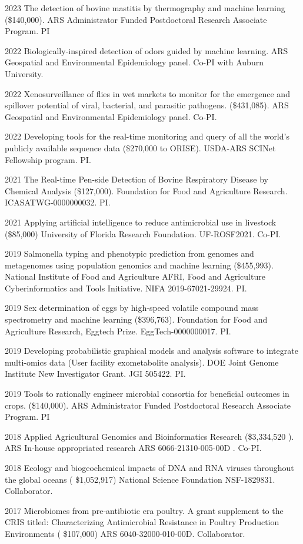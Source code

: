 \documentclass[12pt,letterpaper]{report}
\begin{document}
    \begin{tablist}
    	\item[2023]\tab The detection of bovine mastitis by thermography and machine learning (\$140,000). ARS Administrator Funded Postdoctoral Research Associate Program. PI
    	\item[2022]\tab Biologically-inspired detection of odors guided by machine learning. ARS Geospatial and Environmental Epidemiology panel. Co-PI with Auburn University.
    	\item[2022] \tab Xenosurveillance of flies in wet markets to monitor for the emergence and spillover potential of viral, bacterial, and parasitic pathogens. (\$431,085). ARS Geospatial and Environmental Epidemiology panel. Co-PI.
	\item[2022] \tab Developing tools for the real-time monitoring and query of all the world's publicly available sequence data (\$270,000 to ORISE). USDA-ARS SCINet Fellowship program. PI.
	\item[2021] \tab The Real-time Pen-side Detection of Bovine Respiratory Disease by Chemical Analysis (\$127,000). Foundation for Food and Agriculture Research.  ICASATWG-0000000032. PI.
	\item[2021] \tab Applying artificial intelligence to reduce antimicrobial use in livestock (\$85,000) University of Florida Research Foundation.  UF-ROSF2021. Co-PI.
        \item[2019] \tab  Salmonella typing and phenotypic prediction from genomes and metagenomes using population genomics and machine learning (\$455,993). National Institute of Food and Agriculture AFRI, Food and Agriculture Cyberinformatics and Tools 		Initiative. NIFA 2019-67021-29924.  PI.
        \item[2019]\tab  Sex determination of eggs by high-speed volatile compound mass spectrometry and machine learning  (\$396,763).  Foundation for Food and Agriculture Research, Eggtech Prize.  EggTech-0000000017. PI.
        \item[2019] \tab  Developing probabilistic graphical models and analysis software to integrate multi-omics data (User facility exometabolite analysis). DOE Joint Genome Institute New Investigator Grant. JGI 505422. PI.
        \item[2019] \tab Tools to rationally engineer microbial consortia for beneficial outcomes in crops. (\$140,000). ARS Administrator Funded Postdoctoral Research Associate Program. PI
        \item[2018] \tab  Applied Agricultural Genomics and Bioinformatics Research  (\$3,334,520 ). ARS In-house appropriated research ARS 6066-21310-005-00D . Co-PI.
        \item[2018] \tab Ecology and biogeochemical impacts of DNA and RNA viruses throughout the global  oceans ( \$1,052,917)  National Science Foundation NSF-1829831. Collaborator.
        \item[2017] \tab Microbiomes from pre-antibiotic era poultry. A grant supplement to the CRIS titled: Characterizing Antimicrobial Resistance in Poultry Production Environments  ( \$107,000)  ARS 6040-32000-010-00D. Collaborator.


\end{tablist}
\end{document}
